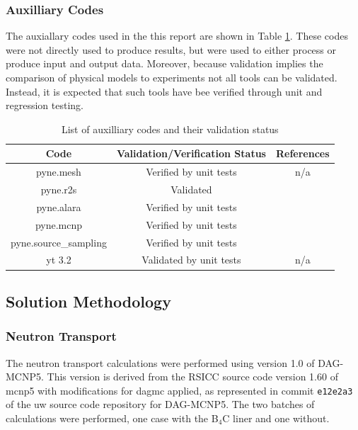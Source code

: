 \documentclass[12pt]{article}
\begin{document}
\subsubsection*{Auxilliary Codes}
The auxiallary codes used in the this report are shown in Table 
\ref{table:validation_aux}. These codes were not directly used to 
produce results, but were used to either process or produce input
and output data.  Moreover, because validation implies the comparison
of physical models to experiments not all tools can be validated.  
Instead, it is expected that such tools have bee verified through
unit and regression testing.
\begin{centering}
 \begin{table}[ht!]
  \begin{tabular}{c | c | c}
  \hline
  Code & Validation/Verification Status & References \\    
  \hline
  pyne.mesh & Verified by unit tests & n/a \\
  pyne.r2s & Validated & \cite{Biondo201677} \\
  pyne.alara & Verified by unit tests & \cite{Biondo201677}  \\
  pyne.mcnp & Verified by unit tests & \cite{Biondo201677}  \\
  pyne.source\_sampling & Verified by unit tests & \cite{Biondo201677} \\
  yt 3.2 & Validated by unit tests & n/a \\
 \end{tabular}
 \caption{List of auxilliary codes and their validation status}
 \label{table:validation_aux}
 \end{table}
\end{centering}

\newpage
\subsection{Solution Methodology}
\label{section:method}
\subsubsection{Neutron Transport}
The neutron transport calculations were performed using version 1.0 of DAG-MCNP5.
This version is derived from the RSICC source code version 1.60 of \gls{mcnp5}
with modifications for \gls{dagmc} applied, as represented in commit \texttt{e12e2a3}
of the \gls{uw} source code repository for DAG-MCNP5.
The two batches of calculations were performed, one
case with the B$_4$C liner and one without.  
\end{document}

